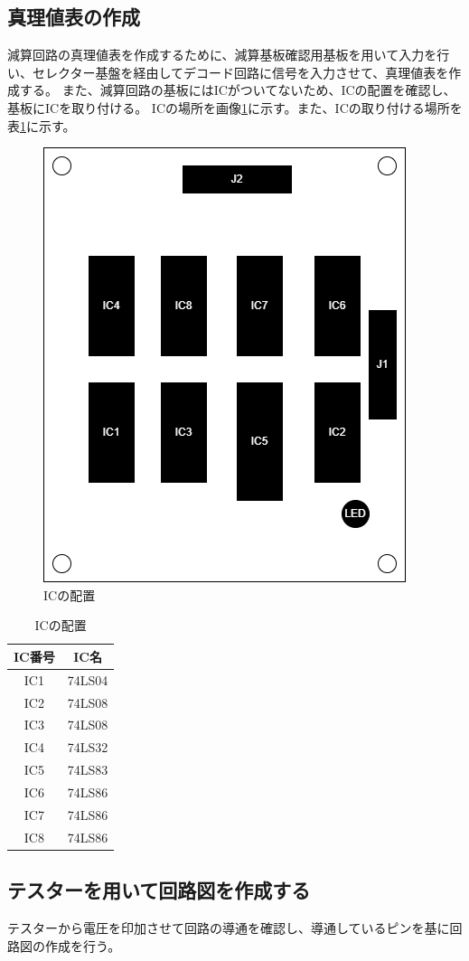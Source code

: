 \documentclass[a4paper,11pt]{ltjsarticle}
\begin{document}
\subsection{真理値表の作成}
減算回路の真理値表を作成するために、減算基板確認用基板を用いて入力を行い、セレクター基盤を経由してデコード回路に信号を入力させて、真理値表を作成する。
また、減算回路の基板にはICがついてないため、ICの配置を確認し、基板にICを取り付ける。
ICの場所を画像\ref{fig:ic}に示す。また、ICの取り付ける場所を表\ref{tab:ic}に示す。
\begin{figure}[htbp]
    \centering
    \includegraphics[width=0.5\columnwidth]{./image/ic.drawio.png}
    \caption{ICの配置}
    \label{fig:ic}
\end{figure}
\begin{table}[htbp]
    \centering
    \caption{ICの配置}
    \begin{tabular}{|c|c|}
        \hline
        IC番号 & IC名 \\
        \hline
        IC1 & 74LS04 \\
        IC2 & 74LS08 \\
        IC3 & 74LS08 \\
        IC4 & 74LS32 \\
        IC5 & 74LS83 \\
        IC6 & 74LS86 \\
        IC7 & 74LS86 \\
        IC8 & 74LS86 \\
        \hline
    \end{tabular}
    \label{tab:ic}
\end{table}
\subsection{テスターを用いて回路図を作成する}
テスターから電圧を印加させて回路の導通を確認し、導通しているピンを基に回路図の作成を行う。
\end{document}
